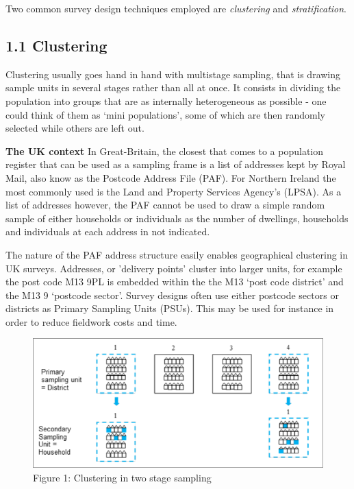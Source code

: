 \documentclass[
  14,
  a4paper,
  DIV=11,
  numbers=noendperiod]{scrartcl}
\begin{document}
Two common survey design techniques employed are \emph{clustering} and
\emph{stratification}.

\hypertarget{clustering}{%
\subsection{1.1 Clustering}\label{clustering}}

Clustering usually goes hand in hand with multistage sampling, that is
drawing sample units in several stages rather than all at once. It
consists in dividing the population into groups that are as internally
heterogeneous as possible - one could think of them as `mini
populations', some of which are then randomly selected while others are
left out.

\textbf{The UK context} In Great-Britain, the closest that comes to a
population register that can be used as a sampling frame is a list of
addresses kept by Royal Mail, also know as the Postcode Address File
(PAF). For Northern Ireland the most commonly used is the Land and
Property Services Agency's (LPSA). As a list of addresses however, the
PAF cannot be used to draw a simple random sample of either households
or individuals as the number of dwellings, households and individuals at
each address in not indicated.

The nature of the PAF address structure easily enables geographical
clustering in UK surveys. Addresses, or 'delivery points' cluster into
larger units, for example the post code M13 9PL is embedded within the
the M13 `post code district' and the M13 9 `postcode sector'. Survey
designs often use either postcode sectors or districts as Primary
Sampling Units (PSUs). This may be used for instance in order to reduce
fieldwork costs and time.

\begin{figure}

{\centering \includegraphics{pics/cluster.png}

}

\caption{Figure 1: Clustering in two stage sampling}

\end{figure}
\end{document}
